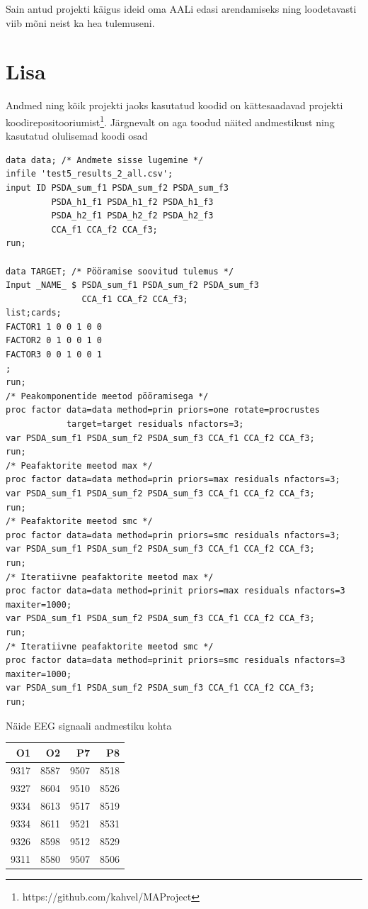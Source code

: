 \documentclass[a4paper,12pt]{report}
\begin{document}
Sain antud projekti käigus ideid oma AALi edasi arendamiseks ning loodetavasti viib mõni neist ka hea tulemuseni.

\appendix
\chapter{Lisa}\label{lisa1}

Andmed ning kõik projekti jaoks kasutatud koodid on kättesaadavad projekti koodirepositooriumist\footnote{https://github.com/kahvel/MAProject}. Järgnevalt on aga toodud näited andmestikust ning kasutatud olulisemad koodi osad

\begin{verbatim}
data data; /* Andmete sisse lugemine */
infile 'test5_results_2_all.csv';
input ID PSDA_sum_f1 PSDA_sum_f2 PSDA_sum_f3
         PSDA_h1_f1 PSDA_h1_f2 PSDA_h1_f3
         PSDA_h2_f1 PSDA_h2_f2 PSDA_h2_f3
         CCA_f1 CCA_f2 CCA_f3;
run;

data TARGET; /* Pööramise soovitud tulemus */
Input _NAME_ $ PSDA_sum_f1 PSDA_sum_f2 PSDA_sum_f3
               CCA_f1 CCA_f2 CCA_f3;
list;cards;
FACTOR1 1 0 0 1 0 0
FACTOR2 0 1 0 0 1 0
FACTOR3 0 0 1 0 0 1
;
run;
/* Peakomponentide meetod pööramisega */
proc factor data=data method=prin priors=one rotate=procrustes
            target=target residuals nfactors=3;
var PSDA_sum_f1 PSDA_sum_f2 PSDA_sum_f3 CCA_f1 CCA_f2 CCA_f3;
run;
/* Peafaktorite meetod max */
proc factor data=data method=prin priors=max residuals nfactors=3;
var PSDA_sum_f1 PSDA_sum_f2 PSDA_sum_f3 CCA_f1 CCA_f2 CCA_f3;
run;
/* Peafaktorite meetod smc */
proc factor data=data method=prin priors=smc residuals nfactors=3;
var PSDA_sum_f1 PSDA_sum_f2 PSDA_sum_f3 CCA_f1 CCA_f2 CCA_f3;
run;
/* Iteratiivne peafaktorite meetod max */
proc factor data=data method=prinit priors=max residuals nfactors=3 maxiter=1000;
var PSDA_sum_f1 PSDA_sum_f2 PSDA_sum_f3 CCA_f1 CCA_f2 CCA_f3;
run;
/* Iteratiivne peafaktorite meetod smc */
proc factor data=data method=prinit priors=smc residuals nfactors=3 maxiter=1000;
var PSDA_sum_f1 PSDA_sum_f2 PSDA_sum_f3 CCA_f1 CCA_f2 CCA_f3;
run;
\end{verbatim}
Näide EEG signaali andmestiku kohta
\begin{longtable}[c]{@{}rrrr@{}}
	\toprule
	O1 & O2 & P7 & P8\tabularnewline
	\midrule
	\endhead
	9317 & 8587 & 9507 & 8518\tabularnewline
	9327 & 8604 & 9510 & 8526\tabularnewline
	9334 & 8613 & 9517 & 8519\tabularnewline
	9334 & 8611 & 9521 & 8531\tabularnewline
	9326 & 8598 & 9512 & 8529\tabularnewline
	9311 & 8580 & 9507 & 8506\tabularnewline
	\bottomrule
\end{longtable}
\end{document}
